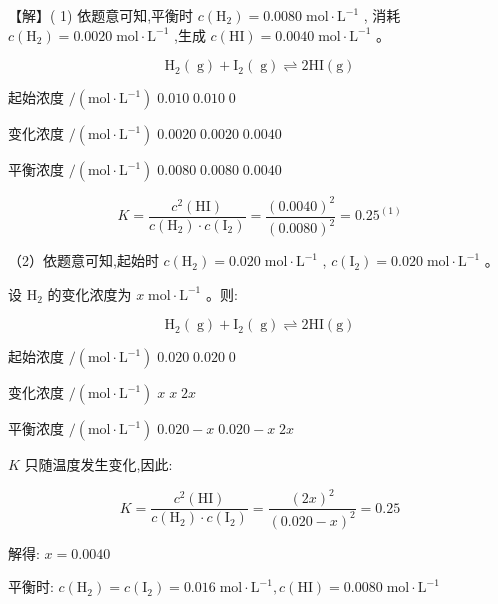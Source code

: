 \documentclass[10pt]{article}
\begin{document}
【解】( 1) 依题意可知,平衡时 \(c\left( {\mathrm{H}}_{2}\right) = {0.0080}\mathrm{\;{mol}} \cdot {\mathrm{L}}^{-1}\) , 消耗 \(c\left( {\mathrm{H}}_{2}\right) = {0.0020}\mathrm{\;{mol}} \cdot {\mathrm{L}}^{-1}\) ,生成 \(c\left( \mathrm{{HI}}\right) = {0.0040}\mathrm{\;{mol}} \cdot {\mathrm{L}}^{-1}\) 。

\[
{\mathrm{H}}_{2}\left( \mathrm{\;g}\right) + {\mathrm{I}}_{2}\left( \mathrm{\;g}\right) \rightleftharpoons 2\mathrm{{HI}}\left( \mathrm{g}\right)
\]

起始浓度 \(/\left( {\mathrm{{mol}} \cdot {\mathrm{L}}^{-1}}\right) \;{0.010}\;{0.010}\;0\)

变化浓度 \(/\left( {\mathrm{{mol}} \cdot {\mathrm{L}}^{-1}}\right) \;{0.0020}\;{0.0020}\;{0.0040}\)

平衡浓度 \(/\left( {\mathrm{{mol}} \cdot {\mathrm{L}}^{-1}}\right) \;{0.0080}\;{0.0080}\;{0.0040}\)

\[
K = \frac{{c}^{2}\left( \mathrm{{HI}}\right) }{c\left( {\mathrm{H}}_{2}\right) \cdot c\left( {\mathrm{I}}_{2}\right) } = \frac{{\left( {0.0040}\right) }^{2}}{{\left( {0.0080}\right) }^{2}} = {0.25}^{\left( 1\right) }
\]

（2）依题意可知,起始时 \(c\left( {\mathrm{H}}_{2}\right) = {0.020}\mathrm{\;{mol}} \cdot {\mathrm{L}}^{-1}\) , \(c\left( {\mathrm{I}}_{2}\right) = {0.020}\mathrm{\;{mol}} \cdot {\mathrm{L}}^{-1}\) 。

设 \({\mathrm{H}}_{2}\) 的变化浓度为 \(x\mathrm{\;{mol}} \cdot {\mathrm{L}}^{-1}\) 。则:

\[
{\mathrm{H}}_{2}\left( \mathrm{\;g}\right) + {\mathrm{I}}_{2}\left( \mathrm{\;g}\right) \rightleftharpoons 2\mathrm{{HI}}\left( \mathrm{g}\right)
\]

起始浓度 \(/\left( {\mathrm{{mol}} \cdot {\mathrm{L}}^{-1}}\right) \;{0.020}\;{0.020}\;0\)

变化浓度 \(/\left( {\mathrm{{mol}} \cdot {\mathrm{L}}^{-1}}\right) \;x\;x\;{2x}\)

平衡浓度 \(/\left( {\mathrm{{mol}} \cdot {\mathrm{L}}^{-1}}\right) \;{0.020} - x\;{0.020} - x\;{2x}\)

\(K\) 只随温度发生变化,因此:

\[
K = \frac{{c}^{2}\left( \mathrm{{HI}}\right) }{c\left( {\mathrm{H}}_{2}\right) \cdot c\left( {\mathrm{I}}_{2}\right) } = \frac{{\left( 2x\right) }^{2}}{{\left( {0.020} - x\right) }^{2}} = {0.25}
\]

解得: \(x = {0.0040}\)

平衡时: \(c\left( {\mathrm{H}}_{2}\right) = c\left( {\mathrm{I}}_{2}\right) = {0.016}\mathrm{\;{mol}} \cdot {\mathrm{L}}^{-1},c\left( \mathrm{{HI}}\right) = {0.0080}\mathrm{\;{mol}} \cdot {\mathrm{L}}^{-1}\)
\end{document}
